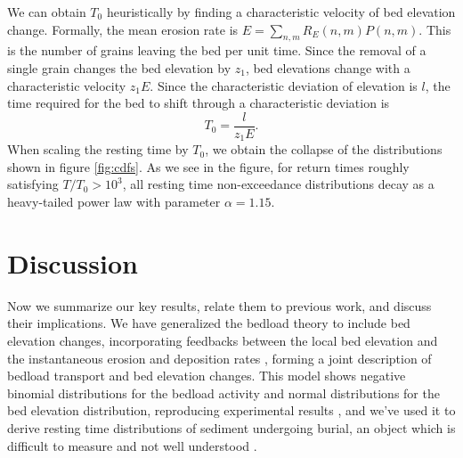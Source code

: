 \documentclass[draft]{agujournal2018}
\newcommand\be{\begin{equation}} %
\newcommand\ee{\end{equation}}   %
\begin{document}
We can obtain $T_0$ heuristically by finding a characteristic velocity of bed elevation change.
Formally, the mean erosion rate is $E = \sum_{n,m}R_E(n,m)P(n,m)$.
This is the number of grains leaving the bed per unit time.
Since the removal of a single grain changes the bed elevation by $z_1$, bed elevations change with a characteristic velocity $z_1 E$.
Since the characteristic deviation of elevation is $l$, the time required for the bed to shift through a characteristic deviation is
\be T_0 = \frac{l}{z_1 E}.\label{eq:time}\ee
When scaling the resting time by $T_0$, we obtain the collapse of the distributions shown in figure \ref{fig:cdfs}.
As we see in the figure, for return times roughly satisfying $T/T_0 > 10^3$, all resting time non-exceedance distributions decay as a heavy-tailed power law with parameter $\alpha = 1.15$.

\section{Discussion}

Now we summarize our key results, relate them to previous work, and discuss their implications.
We have generalized the \citet{Ancey2008} bedload theory to include bed elevation changes, incorporating feedbacks between the local bed elevation and the instantaneous erosion and deposition rates \citep[e.g.][]{Wong2007}, forming a joint description of bedload transport and bed elevation changes. 
This model shows negative binomial distributions for the bedload activity and normal distributions for the bed elevation distribution, reproducing experimental results \citep{Ancey2008, Heyman2016, Wong2007, Singh2009,Martin2014}, and we've used it to derive resting time distributions of sediment undergoing burial, an object which is difficult to measure and not well understood \citep[e.g.][]{Voepel2013,Martin2014, Bradley2017}. 
\end{document}
